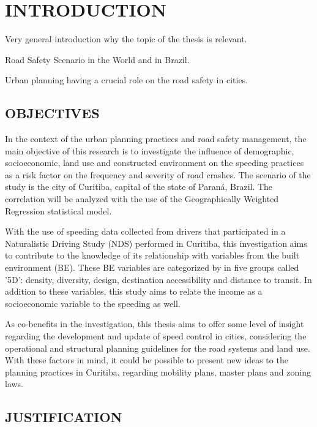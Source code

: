 

\chapter[INTRODUCTION]{INTRODUCTION}

Very general introduction why the topic of the thesis is relevant.

Road Safety Scenario in the World and in Brazil.

Urban planning having a crucial role on the road safety in cities.

\section{OBJECTIVES}

In the context of the urban planning practices and road safety management, the main objective of this research is to investigate the influence of demographic, socioeconomic, land use and constructed environment on the speeding practices as a risk factor on the frequency and severity of road crashes. The scenario of the study is the city of Curitiba, capital of the state of Paraná, Brazil. The correlation will be analyzed with the use of the Geographically Weighted Regression statistical model.

With the use of speeding data collected from drivers that participated in a Naturalistic Driving Study (NDS) performed in Curitiba, this investigation aims to contribute to the knowledge of its relationship with variables from the built environment (BE). These BE variables are categorized by \textcite{Ewing2009} in five groups called '5D': density, diversity, design, destination accessibility and distance to transit. In addition to these variables, this study aims to relate the income as a socioeconomic variable to the speeding as well.

As co-benefits in the investigation, this thesis aims to offer some level of insight regarding the development and update of speed control in cities, considering the operational and structural planning guidelines for the road systems and land use. With these factors in mind, it could be possible to present new ideas to the planning practices in Curitiba, regarding mobility plans, master plans and zoning laws.
    

\section{JUSTIFICATION}

